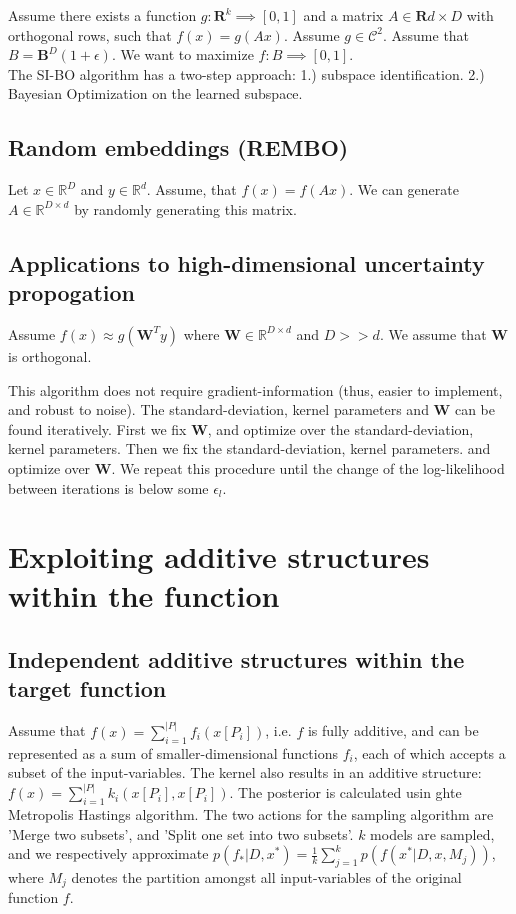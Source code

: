 \citep{Djolonga2013} Assume there exists a function $g : \mathbf{R}^k \implies [0, 1]$ and a matrix $A \in \mathbf{R}{d \times D}$ with orthogonal rows, such that $f(x) = g(Ax) $. Assume $g \in \mathcal{C}^2$. 
Assume that $B = \mathbf{B}^D (1 + \epsilon ) $.
We want to maximize $f: B \implies [0, 1] $.\\

The SI-BO algorithm has a two-step approach:
1.) subspace identification.
2.) Bayesian Optimization on the learned subspace.


\subsection{Random embeddings (REMBO)}
\citep{Wang2013} Let $x \in \mathbb{R}^D$ and $y \in \mathbb{R}^d$. Assume, that $f(x) = f(Ax)$. We can generate $A \in \mathbb{R}^{D \times d}$ by randomly generating this matrix.

\subsection{Applications to high-dimensional uncertainty propogation}
\citep{Tripathy} Assume $f(x) \approx g( \mathbf{W}^T y)$ where $ \mathbf{W} \in \mathbb{R}^{D \times d} $ and $D >> d$.
We assume that $ \mathbf{W} $ is orthogonal.

This algorithm does not require gradient-information (thus, easier to implement, and robust to noise).
The standard-deviation, kernel parameters and  $ \mathbf{W} $ can be found iteratively.
First we fix $ \mathbf{W} $, and optimize over the standard-deviation, kernel parameters.
Then we fix the standard-deviation, kernel parameters. and optimize over $ \mathbf{W} $.
We repeat this procedure until the change of the log-likelihood between iterations is below some $ \epsilon_l $.

\section{Exploiting additive structures within the function}

\subsection{Independent additive structures within the target function}
\citep{Gardner2017} Assume that $f(x) = \sum_{i=1}^{ |P| } f_i (x[P_i] )$, i.e. $f$ is fully additive, and can be represented as a sum of smaller-dimensional functions $f_i$, each of which accepts a subset of the input-variables.
The kernel also results in an additive structure: $f(x) = \sum_{i=1}^{ |P| } k_i (x[P_i], x[P_i])$.
The posterior is calculated usin ghte Metropolis Hastings algorithm.
The two actions for the sampling algorithm are 'Merge two subsets', and 'Split one set into two subsets'.
$k$ models are sampled, and we respectively approximate $p(f_* | D, x^*) = \frac{1}{k} \sum_{j=1}^{k} p( f(x^* | D, x, M_j) )$, where $M_j$ denotes the partition amongst all input-variables of the original function $f$.

